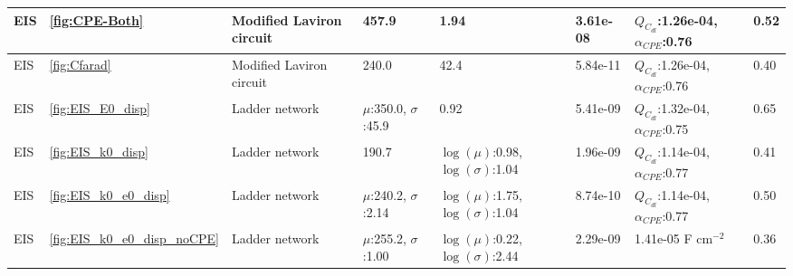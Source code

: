 \begin{table}[]
\begin{tabular}{|l|l|l|lllll|}
EIS &                     \ref{fig:CPE-Both} &                       Modified Laviron circuit &                      \multicolumn{1}{l|}{457.9}&          \multicolumn{1}{l|}{1.94}&               \multicolumn{1}{l|}{3.61e-08}&                        \multicolumn{1}{l|}{$Q_{C_{dl}}$:1.26e-04, $\alpha_{CPE}$:0.76}&           0.52        \\ \hline
EIS &                     \ref{fig:Cfarad} &                       Modified Laviron circuit &                      \multicolumn{1}{l|}{240.0}&          \multicolumn{1}{l|}{42.4}&               \multicolumn{1}{l|}{5.84e-11}&                        \multicolumn{1}{l|}{$Q_{C_{dl}}$:1.26e-04, $\alpha_{CPE}$:0.76}&           0.40        \\ \hline
EIS &                     \ref{fig:EIS_E0_disp} &                       Ladder network &                      \multicolumn{1}{l|}{$\mu$:350.0, $\sigma$:45.9}&          \multicolumn{1}{l|}{0.92}&               \multicolumn{1}{l|}{5.41e-09}&                        \multicolumn{1}{l|}{$Q_{C_{dl}}$:1.32e-04, $\alpha_{CPE}$:0.75}&           0.65        \\ \hline
EIS &                     \ref{fig:EIS_k0_disp} &                       Ladder network &                      \multicolumn{1}{l|}{190.7}&          \multicolumn{1}{l|}{$\log(\mu)$:0.98, $\log(\sigma)$:1.04}&               \multicolumn{1}{l|}{1.96e-09}&                        \multicolumn{1}{l|}{$Q_{C_{dl}}$:1.14e-04, $\alpha_{CPE}$:0.77}&           0.41        \\ \hline
EIS &                     \ref{fig:EIS_k0_e0_disp} &                       Ladder network &                      \multicolumn{1}{l|}{$\mu$:240.2, $\sigma$:2.14}&          \multicolumn{1}{l|}{$\log(\mu)$:1.75, $\log(\sigma)$:1.04}&               \multicolumn{1}{l|}{8.74e-10}&                        \multicolumn{1}{l|}{$Q_{C_{dl}}$:1.14e-04, $\alpha_{CPE}$:0.77}&           0.50        \\ \hline
EIS &                     \ref{fig:EIS_k0_e0_disp_noCPE} &                       Ladder network &                      \multicolumn{1}{l|}{$\mu$:255.2, $\sigma$:1.00}&          \multicolumn{1}{l|}{$\log(\mu)$:0.22, $\log(\sigma)$:2.44}&               \multicolumn{1}{l|}{2.29e-09}&                        \multicolumn{1}{l|}{1.41e-05 F cm$^{-2}$}&           0.36        \\ \hline
\end{tabular}
\end{table}